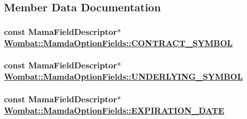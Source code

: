 \subsection{Member Data Documentation}
\hypertarget{classWombat_1_1MamdaOptionFields_8d69ee7f7bd0301816d0c27c58b897ed}{
\subsubsection[CONTRACT\_\-SYMBOL]{\setlength{\rightskip}{0pt plus 5cm}const Mama\-Field\-Descriptor$\ast$ \hyperlink{classWombat_1_1MamdaOptionFields_8d69ee7f7bd0301816d0c27c58b897ed}{Wombat::Mamda\-Option\-Fields::CONTRACT\_\-SYMBOL}}}
\label{classWombat_1_1MamdaOptionFields_8d69ee7f7bd0301816d0c27c58b897ed}


\hypertarget{classWombat_1_1MamdaOptionFields_ea8d3e93841f6c2bee999fb1bdbb64b4}{
\subsubsection[UNDERLYING\_\-SYMBOL]{\setlength{\rightskip}{0pt plus 5cm}const Mama\-Field\-Descriptor$\ast$ \hyperlink{classWombat_1_1MamdaOptionFields_ea8d3e93841f6c2bee999fb1bdbb64b4}{Wombat::Mamda\-Option\-Fields::UNDERLYING\_\-SYMBOL}}}
\label{classWombat_1_1MamdaOptionFields_ea8d3e93841f6c2bee999fb1bdbb64b4}


\hypertarget{classWombat_1_1MamdaOptionFields_7417557c75723fda93fefbd7b6b14f2d}{
\subsubsection[EXPIRATION\_\-DATE]{\setlength{\rightskip}{0pt plus 5cm}const Mama\-Field\-Descriptor$\ast$ \hyperlink{classWombat_1_1MamdaOptionFields_7417557c75723fda93fefbd7b6b14f2d}{Wombat::Mamda\-Option\-Fields::EXPIRATION\_\-DATE}}}
\label{classWombat_1_1MamdaOptionFields_7417557c75723fda93fefbd7b6b14f2d}


